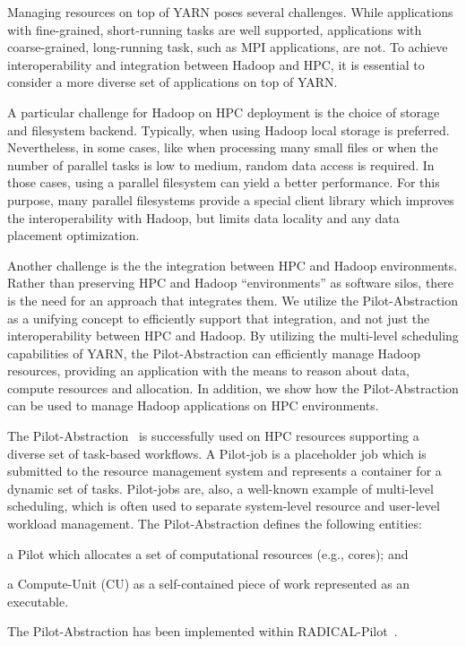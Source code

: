 Managing resources on top of YARN poses several challenges. While applications
with fine-grained, short-running tasks are well supported, applications with
coarse-grained, long-running task, such as MPI applications, are not. To achieve
interoperability and integration between Hadoop and HPC, it is essential to
consider a more diverse set of applications on top of YARN.

A particular challenge for Hadoop on HPC deployment is the choice of storage and
filesystem backend. Typically, when using Hadoop local storage is preferred.
Nevertheless, in some cases, like when processing many small files or when
the number of parallel tasks is low to medium, random data access is required.
In those cases, using a parallel filesystem can yield a better performance. For
this purpose, many parallel filesystems provide a special client library which
improves the interoperability with Hadoop, but limits data locality and any data
placement optimization.

Another challenge is the the integration between HPC and Hadoop environments.
Rather than preserving HPC and Hadoop ``environments'' as software silos, there
is the need for an approach that integrates them. We utilize the
Pilot-Abstraction as a unifying concept to efficiently support that integration,
and not just the interoperability between HPC and Hadoop. By utilizing the
multi-level scheduling capabilities of YARN, the Pilot-Abstraction can
efficiently manage Hadoop resources, providing an application with the means to
reason about data, compute resources and allocation. In addition, we show how
the Pilot-Abstraction can be used to manage Hadoop applications on HPC
environments.

The Pilot-Abstraction~\cite{luckow2012pstar} is successfully used on HPC
resources supporting a diverse set of task-based workflows. A Pilot-job is a
placeholder job which is submitted to the resource management system and
represents a container for a dynamic set of tasks. Pilot-jobs are, also, a
well-known example of multi-level scheduling, which is often used to separate
system-level resource and user-level workload management. The Pilot-Abstraction
defines the following entities:
\begin{inparaenum} [1)]
    \item a Pilot which allocates a set of computational resources (e.g.,
    cores); and
    \item  a Compute-Unit (CU) as a self-contained piece of work represented as
    an executable.
\end{inparaenum}
The Pilot-Abstraction has been implemented within
RADICAL-Pilot~\cite{merzky2018design}.


